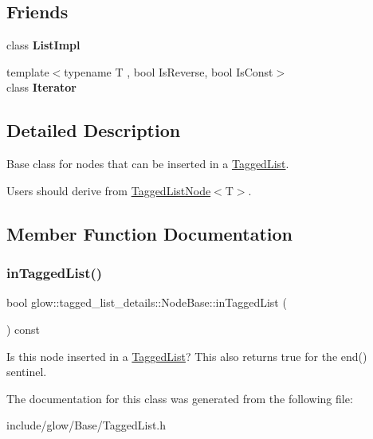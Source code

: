 \subsection*{Friends}
\begin{DoxyCompactItemize}
\item 
\mbox{\label{classglow_1_1tagged__list__details_1_1_node_base_a5a83b4dfbe14d4a3034419350b6ed82c}} 
class {\bfseries List\+Impl}
\item 
\mbox{\label{classglow_1_1tagged__list__details_1_1_node_base_aa5c83577652250640bc983f4725cc75b}} 
{\footnotesize template$<$typename T , bool Is\+Reverse, bool Is\+Const$>$ }\\class {\bfseries Iterator}
\end{DoxyCompactItemize}


\subsection{Detailed Description}
Base class for nodes that can be inserted in a {\ttfamily \hyperlink{classglow_1_1_tagged_list}{Tagged\+List}}.

Users should derive from {\ttfamily \hyperlink{classglow_1_1_tagged_list_node}{Tagged\+List\+Node}$<$T$>$}. 

\subsection{Member Function Documentation}
\mbox{\label{classglow_1_1tagged__list__details_1_1_node_base_af9089de2767fa3a4df48cb6d5b401c6a}} 
\subsubsection{\texorpdfstring{in\+Tagged\+List()}{inTaggedList()}}
{\footnotesize\ttfamily bool glow\+::tagged\+\_\+list\+\_\+details\+::\+Node\+Base\+::in\+Tagged\+List (\begin{DoxyParamCaption}{ }\end{DoxyParamCaption}) const\hspace{0.3cm}{\ttfamily [inline]}}

Is this node inserted in a \hyperlink{classglow_1_1_tagged_list}{Tagged\+List}? This also returns true for the end() sentinel. 

The documentation for this class was generated from the following file\+:\begin{DoxyCompactItemize}
\item 
include/glow/\+Base/Tagged\+List.\+h\end{DoxyCompactItemize}
